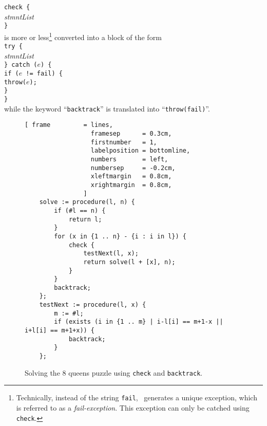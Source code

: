 \hspace*{1.3cm}
\texttt{check \{} 
\\
\hspace*{1.8cm}
\textsl{stmntList}
\\
\hspace*{1.3cm}
\texttt{\}}
\\[0.2cm]
is more or less\footnote{
Technically, instead of the string \texttt{fail}, \setlx\ 
generates a unique exception, which is referred to as a \emph{fail-exception}.
This exception can only be catched using \texttt{check}. 
}
converted into a block of the form
\\[0.2cm]
\hspace*{1.3cm}
\texttt{try \{} 
\\
\hspace*{1.8cm}
\textsl{stmntList}
\\
\hspace*{1.3cm}
\texttt{\} catch ($e$) \{}
\\
\hspace*{1.8cm}
\texttt{if ($e$ != fail) \{}
\\
\hspace*{2.3cm}
\texttt{throw($e$);}
\\
\hspace*{1.8cm}
\texttt{\}}
\\
\hspace*{1.3cm}
\texttt{\}}
\\[0.2cm]
while the keyword ``\texttt{backtrack}'' is translated into
``\texttt{throw(fail\symbol{34})}''.   


\begin{figure}[!ht]
\centering
\begin{Verbatim}[ frame         = lines, 
                  framesep      = 0.3cm, 
                  firstnumber   = 1,
                  labelposition = bottomline,
                  numbers       = left,
                  numbersep     = -0.2cm,
                  xleftmargin   = 0.8cm,
                  xrightmargin  = 0.8cm,
                ]
    solve := procedure(l, n) { 
        if (#l == n) {
            return l;
        }
        for (x in {1 .. n} - {i : i in l}) {
            check {
                testNext(l, x);
                return solve(l + [x], n);
            } 
        }
        backtrack;
    };
    testNext := procedure(l, x) {
        m := #l;
        if (exists (i in {1 .. m} | i-l[i] == m+1-x || i+l[i] == m+1+x)) {
            backtrack;
        }
    };
\end{Verbatim}
\vspace*{-0.3cm}
\caption{Solving the 8 queens puzzle using \texttt{check} and \texttt{backtrack}.}
\label{fig:queens-nice.stlx}
\end{figure}

